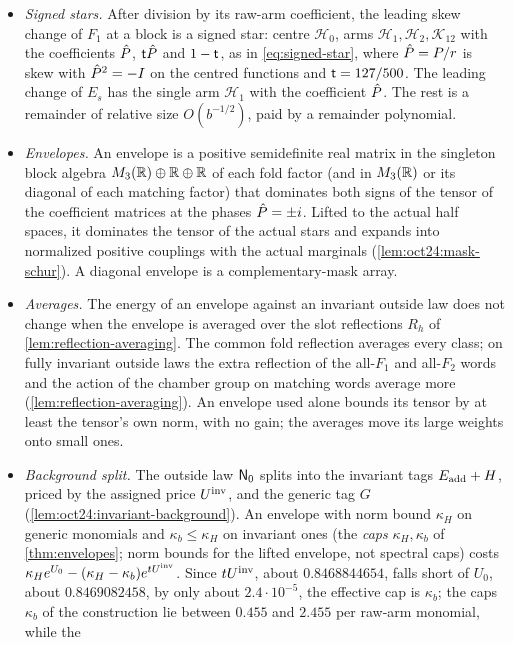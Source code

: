 \begin{itemize}
\item \emph{Signed stars.} After division by its raw-arm coefficient, the leading
 skew change of $F_1$ at a block is a signed star: centre $\mathcal H_0$, arms
 $\mathcal H_1,\mathcal H_2,\mathcal K_{12}$ with the coefficients $\hat P$,
 $\mathsf t\hat P$ and $1-\mathsf t$, as in \eqref{eq:signed-star}, where $\hat P=P/r$ is skew with
 $\hat P^2=-I$ on the centred functions and $\mathsf t=127/500$. The leading change of
 $E_s$ has the single arm $\mathcal H_1$ with the coefficient $\hat P$. The rest is a
 remainder of relative size $O(b^{-1/2})$, paid by a remainder polynomial.
\item \emph{Envelopes.} An envelope is a positive semidefinite real matrix in the
 singleton block algebra $M_3(\mathbb R)\oplus\mathbb R\oplus\mathbb R$ of each fold factor (and in
 $M_3(\mathbb R)$ or its diagonal of each matching factor) that dominates both signs of
 the tensor of the coefficient matrices at the phases $\hat P=\pm i$. Lifted to the
 actual half spaces, it dominates the tensor of the actual stars and expands into
 normalized positive couplings with the actual marginals
 (\cref{lem:oct24:mask-schur}). A diagonal envelope is a complementary-mask array.
\item \emph{Averages.} The energy of an envelope against an invariant outside law
 does not change when the envelope is averaged over the slot reflections $R_h$ of \cref{lem:reflection-averaging}. The
 common fold reflection averages every class; on fully invariant outside laws the
 extra reflection of the all-$F_1$ and all-$F_2$ words and the action of the
 chamber group on matching words average more
 (\cref{lem:reflection-averaging}). An envelope used alone bounds its tensor by at least the tensor's own norm, with no gain; the averages move its large weights onto small ones.
\item \emph{Background split.} The outside law $\mathsf N_0$ splits into the invariant
 tags $E_{\rm add}+H$, priced by the assigned price $U^{\mathrm{inv}}$, and the generic tag $G$
 (\cref{lem:oct24:invariant-background}). An envelope with norm bound $\kappa_H$ on generic monomials and $\kappa_b\le\kappa_H$ on invariant ones (the \emph{caps} $\kappa_H,\kappa_b$ of \cref{thm:envelopes}; norm bounds for the lifted envelope, not spectral caps) costs
 $\kappa_He^{U_0}-(\kappa_H-\kappa_b)e^{tU^{\mathrm{inv}}}$. Since $tU^{\mathrm{inv}}$, about
 $0.8468844654$, falls short of $U_0$, about $0.8469082458$, by only about
 $2.4\cdot10^{-5}$, the effective cap is $\kappa_b$; the caps $\kappa_b$ of the
 construction lie between $0.455$ and $2.455$ per raw-arm monomial, while the

\end{itemize}
